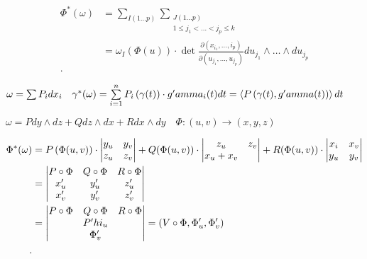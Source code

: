 \begin{statement}
\begin{enumerate}
        \begin{align*}
            \Phi^*(\omega) &= \sum_{I(1\ldots p)}\sum_{\substack{J(1\ldots p)\\ 1\leqslant j_1 < \ldots < j_p \leqslant k}}\\
            &= \omega_I(\Phi(u)) \cdot \det \frac{\partial \left( x_{i_1}, \ldots, i_p \right) }{\partial \left( u_{j_1}, \ldots, u_{j_p} \right) }du_{j_1}\wedge \ldots\wedge du_{j_p}\\
        .\end{align*}

        $\omega = \sum P_idx_i\quad \gamma^*(\omega) = \sum_{i=1}^{n} P_i\left( \gamma(t) \right) \cdot \p gamma_i(t)dt = \left<P\left( \gamma(t),\p gamma(t) \right) \right> dt$

        $\omega = Pdy\wedge dz + Qdz\wedge dx + Rdx\wedge dy\quad \Phi:(u,v) \to (x,y,z)$

        \begin{align*}
            \Phi^*(\omega) &= P\left( \Phi(u,v) \right) \cdot \begin{vmatrix}
                y_u&y_v\\ z_u& z_v\\
            \end{vmatrix} + Q(\Phi(u,v)) \cdot \begin{vmatrix}
                z_u & z_v\\ x_u + x_v\\
            \end{vmatrix} + R(\Phi(u,v)) \cdot \begin{vmatrix}
            x_i&x_v\\ y_u & y_v\\
            \end{vmatrix}\\
            &= \begin{vmatrix}
                P\circ \Phi & Q \circ \Phi & R \circ \Phi\\
                x^{\prime}_u & y^{\prime}_u & z^{\prime}_u\\ x^{\prime}_v & y^{\prime}_v & z^{\prime}_v\\
            \end{vmatrix} \\
            &= \begin{vmatrix}
                P\circ \Phi & Q \circ \Phi & R \circ \Phi\\
                & P^{\prime}hi_u&\\&\Phi^{\prime}_v&
            \end{vmatrix} = \left( V\circ\Phi, \Phi^{\prime}_u, \Phi^{\prime}_v \right)  \\
        .\end{align*}
    \end{enumerate}
\end{statement}

